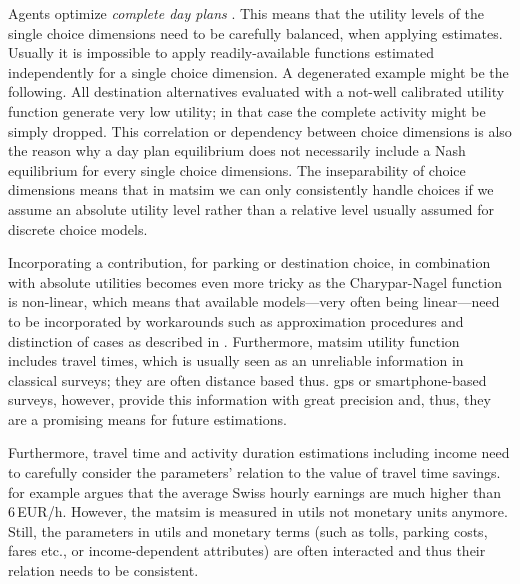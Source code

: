 Agents optimize \emph{complete day plans} \citep[see also][Section 6.3.1]{MATSim_Userguide_2015}. This means that the utility levels of the single choice dimensions need to be carefully balanced, when applying estimates. Usually it is impossible to apply readily-available functions estimated independently for a single choice dimension. A degenerated example might be the following. All destination alternatives evaluated with a not-well calibrated utility function generate very low utility; in that case the complete activity might be simply dropped. 
%
%
%
This correlation or dependency between choice dimensions is also the reason why a day plan equilibrium does not necessarily include a Nash equilibrium for every single choice dimensions. The inseparability of choice dimensions means that in \gls{matsim} we can only consistently handle choices if we assume an absolute utility level rather than a relative level usually assumed for discrete choice models.
%

Incorporating a contribution, \eg for parking or destination choice, in combination with absolute utilities becomes even more tricky as the Charypar-Nagel function is non-linear, which means that available models---very often being linear---need to be incorporated by workarounds such as approximation procedures and distinction of cases as described in \citet[][p.75ff]{Horni_PhDThesis_2013}. Furthermore, \gls{matsim} utility function includes travel times, which is usually seen as an unreliable information in classical surveys; they are often distance based thus. \gls{gps} or smartphone-based surveys, however, provide this information with great precision and, thus, they are a promising means for future estimations.

Furthermore, travel time and activity duration estimations including income need to carefully consider the parameters' relation to the value of travel time savings. \citet[][p.276]{MeisterEtAl_SVT_2009} for example argues that the average Swiss hourly earnings are much higher than 6\,EUR/h. However, the \gls{matsim} is measured in utils not monetary units anymore. Still, the parameters in utils and monetary terms (such as tolls, parking costs, fares etc., or income-dependent attributes) are often interacted and thus their relation needs to be consistent.
%

